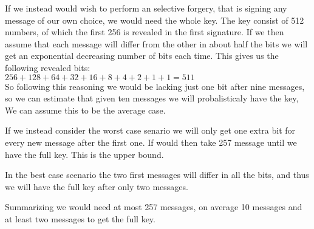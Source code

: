 \documentclass[a4paper,11pt]{article}
\begin{document}
	If we instead would wish to perform an selective forgery, that is signing any message
	of our own choice, we would need the whole key. The key consist of 512 numbers, of which
	the first 256 is revealed in the first signature. If we then assume that each message
	will differ from the other in about half the bits we will get an exponential decreasing
	number of bits each time. This gives us the following revealed bits:\\
	$256 + 128 + 64 + 32 + 16 + 8 + 4 + 2 + 1 + 1= 511$\\
	So following this reasoning we would be lacking just one bit after nine messages, so we
	can estimate that given ten messages we will probalisticaly have the key, We can assume
	this to be the average case.

	If we instead consider the worst case senario we will only get one extra bit for every
	new message after the first one. If would then take 257 message until we have the full
	key. This is the upper bound.

	In the best case scenario the two first messages will differ in all the bits, and thus
	we will have the full key after only two messages.

	Summarizing we would need at most 257 messages, on average 10 messages and at least two
	messages to get the full key.

		 
		
\end{document}
